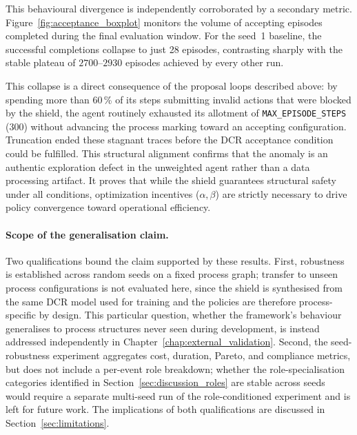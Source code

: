 This behavioural divergence is independently corroborated by a secondary metric. Figure~\ref{fig:acceptance_boxplot} monitors the volume of accepting episodes completed during the final evaluation window. For the seed~1 baseline, the successful completions collapse to just 28 episodes, contrasting sharply with the stable plateau of $2700$--$2930$ episodes achieved by every other run.

This collapse is a direct consequence of the proposal loops described above: by spending more than 60\,\% of its steps submitting invalid actions that were blocked by the shield, the agent routinely exhausted its allotment of \texttt{MAX\_EPISODE\_STEPS} ($300$) without advancing the process marking toward an accepting configuration. Truncation ended these stagnant traces before the DCR acceptance condition could be fulfilled. This structural alignment confirms that the anomaly is an authentic exploration defect in the unweighted agent rather than a data processing artifact. It proves that while the shield guarantees structural safety under all conditions, optimization incentives ($\alpha,\beta$) are strictly necessary to drive policy convergence toward operational efficiency.



\paragraph{Scope of the generalisation claim.}
Two qualifications bound the claim supported by these results.
First, robustness is established across random seeds on a
fixed process graph; transfer to unseen process
configurations is not evaluated here, since the shield is
synthesised from the same \ac{DCR} model used for training and
the policies are therefore process-specific by design. This
particular question, whether the framework's behaviour generalises to
process structures never seen during development, is instead addressed
independently in Chapter~\ref{chap:external_validation}. Second, the
seed-robustness experiment aggregates cost, duration,
Pareto, and compliance metrics, but does not include a
per-event role breakdown; whether the role-specialisation
categories identified in Section~\ref{sec:discussion_roles}
are stable across seeds would require a separate multi-seed
run of the role-conditioned experiment and is left for future
work. The implications of both qualifications are discussed in
Section~\ref{sec:limitations}.
